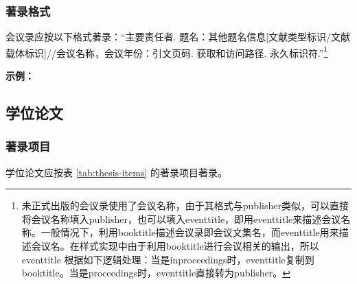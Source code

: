 \documentclass[twoside]{article}%
\begin{document}

\subsubsection{著录格式}\label{sec:confer:biblieg}
会议录应按以下格式著录：“主要责任者. 题名：其他题名信息[文献类型标识/文献载体标识]//会议名称，会议年份：引文页码. 获取和访问路径. 永久标识符.”\footnote{未正式出版的会议录使用了会议名称，由于其格式与publisher类似，可以直接将会议名称填入publisher，也可以填入eventtitle，即用eventtitle来描述会议名称。一般情况下，利用booktitle描述会议录即会议文集名，而eventtitle用来描述会议名。在样式实现中由于利用booktitle进行会议相关的输出，所以 eventtitle 根据如下逻辑处理：当是inproceedings时，eventtitle复制到booktitle。当是proceedings时，eventtitle直接转为publisher。}


\begin{refsection}

\nocite{gbt7714.8.6.3:1,gbt7714.8.6.3:2,gbt7714.8.6.3:3}

{

\mbox{}{\small\textbf{示例：} \par}

{\printbibliography[heading=none,env=indentegenv]}
}
\end{refsection}


\subsection{学位论文}\label{sec:entrytype:thesis}

\subsubsection{著录项目}
学位论文应按表 \ref{tab:thesis-items} 的著录项目著录。
\end{document}
